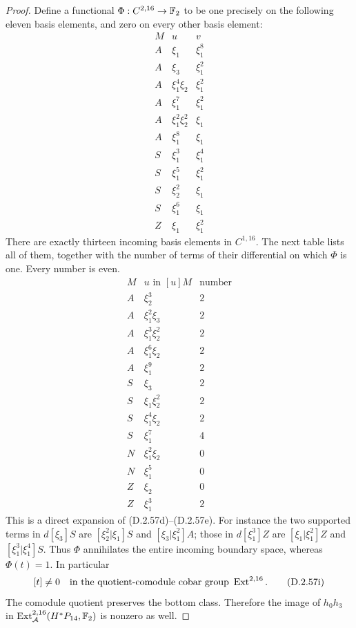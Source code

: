 \begin{proof}
Define a functional $\Phi:C^{2,16}\to\mathbb F_2$ to be
one precisely on the following eleven basis elements,
and zero on every other basis element:
\[
\begin{array}{c|cc}
 M&u&v\\ \hline
 A&\xi_1&\xi_1^8\\
 A&\xi_3&\xi_1^2\\
 A&\xi_1^4\xi_2&\xi_1^2\\
 A&\xi_1^7&\xi_1^2\\
 A&\xi_1^2\xi_2^2&\xi_1\\
 A&\xi_1^8&\xi_1\\
 S&\xi_1^3&\xi_1^4\\
 S&\xi_1^5&\xi_1^2\\
 S&\xi_2^2&\xi_1\\
 S&\xi_1^6&\xi_1\\
 Z&\xi_1&\xi_1^2
\end{array}
 \tag{D.2.57g}
\]
There are exactly thirteen incoming basis elements in
$C^{1,16}$.  The next table lists all of them, together
with the number of terms of their differential on which
$\Phi$ is one.  Every number is even.
\[
\begin{array}{c|c|r}
 M&u\text{ in }[u]M&\text{number}\\ \hline
 A&\xi_2^3&2\\
 A&\xi_1^2\xi_3&2\\
 A&\xi_1^3\xi_2^2&2\\
 A&\xi_1^6\xi_2&2\\
 A&\xi_1^9&2\\
 S&\xi_3&2\\
 S&\xi_1\xi_2^2&2\\
 S&\xi_1^4\xi_2&2\\
 S&\xi_1^7&4\\
 N&\xi_1^2\xi_2&0\\
 N&\xi_1^5&0\\
 Z&\xi_2&0\\
 Z&\xi_1^3&2
\end{array}
 \tag{D.2.57h}
\]
This is a direct expansion of
\textup{(D.2.57d)--(D.2.57e)}.  For instance the two
supported terms in $d[\xi_3]S$ are
$[\xi_2^2|\xi_1]S$ and $[\xi_3|\xi_1^2]A$;
those in $d[\xi_1^3]Z$ are
$[\xi_1|\xi_1^2]Z$ and $[\xi_1^3|\xi_1^4]S$.
Thus $\Phi$ annihilates the entire incoming boundary
space, whereas $\Phi(t)=1$.  In particular
\[
       [t]\ne0\quad\hbox{in the quotient-comodule
                     cobar group }\operatorname{Ext}^{2,16}.
       \tag{D.2.57i}
\]
The comodule quotient preserves the bottom class.
Therefore the image of $h_0h_3$ in
$\operatorname{Ext}_{\mathcal A}^{2,16}
(H^*P_{14},\mathbb F_2)$ is nonzero as well.


\end{proof}
